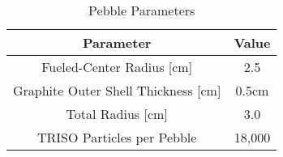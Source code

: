 \begin{table}[h!]
\centering
\begin{tabular}{ c  c }
\hline
Parameter & Value \\
\hline
Fueled-Center Radius [cm] & 2.5 \\
Graphite Outer Shell Thickness [cm] & 0.5cm \\
Total Radius [cm] & 3.0 \\
TRISO Particles per Pebble & 18,000 \\
\hline
\end{tabular}
\caption{Pebble Parameters}
\label{table:params2}
\end{table}